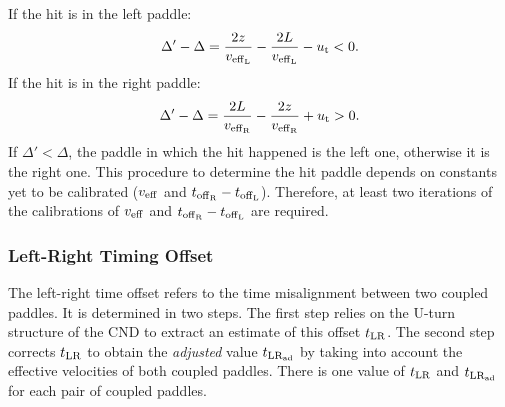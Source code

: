 If the hit is in the left paddle:
\begin{equation}
\Delta'-\Delta= \frac{2z}{v_{\rm{eff}_L}} - \frac{2L}{v_{\rm{eff}_L}} -u_{\rm{t}} <0.
\end{equation}
If the hit is in the right paddle:
\begin{equation}
\Delta'-\Delta= \frac{2L}{v_{\rm{eff}_{\rm{R}}}}-\frac{2z}{v_{\rm{eff}_{\rm{R}}}} +u_{\rm{t}} >0.
\end{equation}
If $\Delta'<\Delta$, the paddle in which the hit happened is the left one, otherwise it is the right one. This procedure to determine the hit paddle depends on constants yet to be calibrated ($v_{\rm{eff}}$ and $t_{\rm{off}_{\rm{R}}}-t_{\rm{off}_{\rm{L}}}$). Therefore, at least two iterations of the calibrations of $v_{\rm{eff}}$ and $t_{\rm{off}_{\rm{R}}}-t_{\rm{off}_{\rm{L}}}$ are required.

\subsubsection{Left-Right Timing Offset}

The left-right time offset refers to the time misalignment between two coupled paddles. It is determined in two steps. The first step relies on the U-turn structure of the CND to extract an estimate of this offset $t_{\rm{LR}}$. The second step corrects $t_{\rm{LR}}$ to obtain the {\it adjusted} value $t_{\rm{LR}_{\rm{ad}}}$ by taking into account the effective velocities of both coupled paddles. There is one value of $t_{\rm{LR}}$ and $t_{\rm{LR}_{\rm{ad}}}$ for each pair of coupled paddles. 

